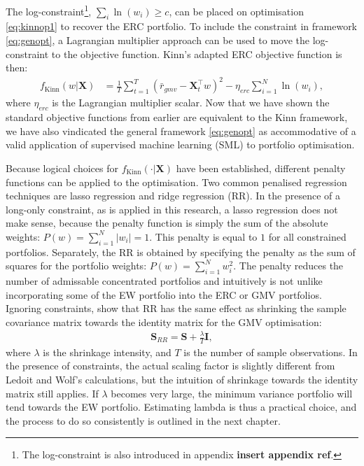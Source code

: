 \documentclass[
]{article}
\begin{document}
The log-constraint\footnote{The log-constraint is also introduced in appendix \textbf{insert appendix ref}.},
\(\sum_i \ln(w_i) \geq c\), can be placed on optimisation \eqref{eq:kinnop1} to recover the ERC
portfolio. To include the constraint in framework \eqref{eq:genopt}, a Lagrangian multiplier approach
can be used to move the log-constraint to the objective function. Kinn's adapted ERC objective
function is then:
\begin{align}
f_{\text{Kinn}}(w|\textbf{X}) &= \frac{1}{T} \sum_{t = 1}^T  (\bar{r}_{gmv} - \textbf{X}^\intercal_t w)^2 -\eta_{erc}\sum_{i = 1}^N \ln(w_i),
\end{align}
where \(\eta_{erc}\) is the Lagrangian multiplier scalar. Now that we have shown the standard objective
functions from earlier are equivalent to the Kinn framework, we have also vindicated the general
framework \eqref{eq:genopt} as accommodative of a valid application of supervised machine learning
(SML) to portfolio optimisation.

Because logical choices for \(f_{\text{Kinn}}(\cdot|\textbf{X})\) have been established, different
penalty functions can be applied to the optimisation. Two common penalised regression techniques are
lasso regression and ridge regression (RR). In the presence of a long-only constraint, as is applied
in this research, a lasso regression does not make sense, because the penalty function is simply the
sum of the absolute weights: \(P(w) = \sum_{i= 1}^N |w_i| =1\). This penalty is equal to \(1\) for all
constrained portfolios. Separately, the RR is obtained by specifying the penalty as the sum of squares
for the portfolio weights: \(P(w) = \sum_{i= 1}^N w_i^2\). The penalty reduces the number of admissable
concentrated portfolios and intuitively is not unlike incorporating some of the EW portfolio into the
ERC or GMV portfolios. Ignoring constraints, \citet{LW04} show that RR has the same effect as shrinking
the sample covariance matrix towards the identity matrix for the GMV optimisation:
\begin{align}
\textbf{S}_{RR} = \textbf{S} + \frac{\lambda}{T} \textbf{I}, 
\end{align}
where \(\lambda\) is the shrinkage intensity, and \(T\) is the number of sample observations. In the
presence of constraints, the actual scaling factor is slightly different from Ledoit and Wolf's
calculations, but the intuition of shrinkage towards the identity matrix still applies. If \(\lambda\)
becomes very large, the minimum variance portfolio will tend towards the EW portfolio. Estimating
lambda is thus a practical choice, and the process to do so consistently is outlined in the next
chapter.
\end{document}
